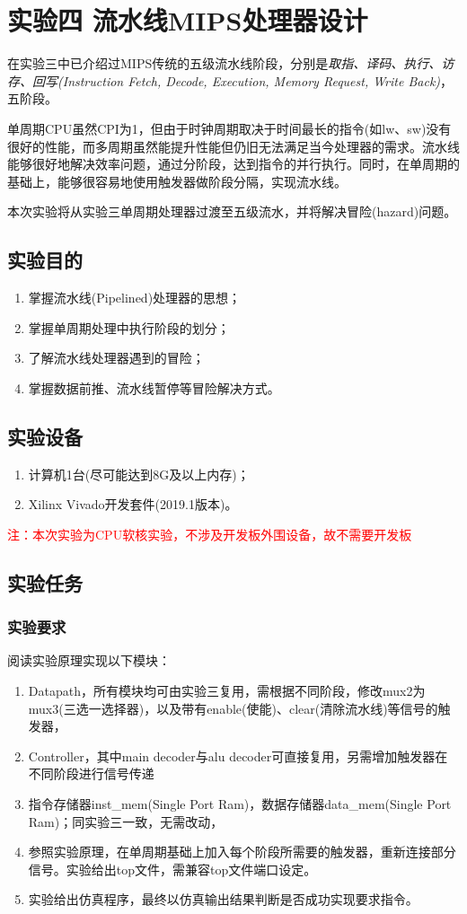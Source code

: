 \section{实验四 \quad 流水线MIPS处理器设计}
在实验三中已介绍过MIPS传统的五级流水线阶段，分别是\textit{取指、译码、执行、访存、回写(Instruction Fetch, Decode, Execution, Memory Request, Write Back)}，五阶段。

单周期CPU虽然CPI为1，但由于时钟周期取决于时间最长的指令(如lw、sw)没有很好的性能，而多周期虽然能提升性能但仍旧无法满足当今处理器的需求。流水线能够很好地解决效率问题，通过分阶段，达到指令的并行执行。同时，在单周期的基础上，能够很容易地使用触发器做阶段分隔，实现流水线。

本次实验将从实验三单周期处理器过渡至五级流水，并将解决冒险(hazard)问题。

\subsection{实验目的}
\begin{enumerate}
	\item 掌握流水线(Pipelined)处理器的思想；
	\item 掌握单周期处理中执行阶段的划分；
	\item 了解流水线处理器遇到的冒险；
	\item 掌握数据前推、流水线暂停等冒险解决方式。
\end{enumerate}
\subsection{实验设备}
\begin{enumerate}
    \item 计算机1台(尽可能达到8G及以上内存)；
    \item Xilinx Vivado开发套件(2019.1版本)。
\end{enumerate}
\textcolor{red}{注：本次实验为CPU软核实验，不涉及开发板外围设备，故不需要开发板
}
\subsection{实验任务}
\subsubsection{实验要求}
阅读实验原理实现以下模块：
\begin{enumerate}[(1)]
    \item Datapath，所有模块均可由实验三复用，需根据不同阶段，修改mux2为mux3(三选一选择器)，以及带有enable(使能)、clear(清除流水线)等信号的触发器，
    \item Controller，其中main decoder与alu decoder可直接复用，另需增加触发器在不同阶段进行信号传递
    \item 指令存储器inst\_mem(Single Port Ram)，数据存储器data\_mem(Single Port Ram)；同实验三一致，无需改动，
    \item 参照实验原理，在单周期基础上加入每个阶段所需要的触发器，重新连接部分信号。实验给出top文件，需兼容top文件端口设定。
    \item 实验给出仿真程序，最终以仿真输出结果判断是否成功实现要求指令。
\end{enumerate}

